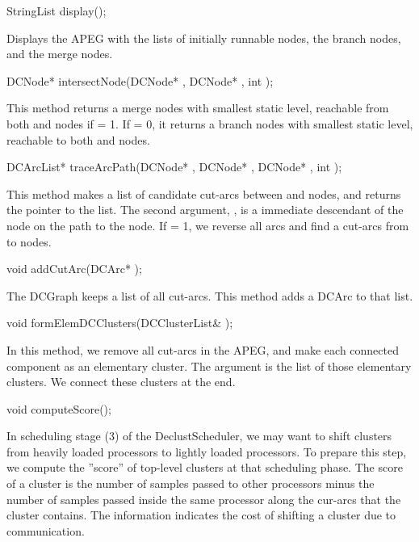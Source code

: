 \begin{example}
StringList display();
\end{example}

Displays the APEG with the lists of initially runnable nodes, the branch
nodes, and the merge nodes.

\begin{example}
DCNode* intersectNode(DCNode* , DCNode* , int );
\end{example}

This method returns a merge nodes with smallest static level, reachable from
both  and  nodes if  = 1. 
If  = 0, it returns a branch nodes with smallest static level,
reachable to both  and  nodes.

\begin{example}
DCArcList* traceArcPath(DCNode* , DCNode* , DCNode* , int );
\end{example}

This method makes a list of candidate cut-arcs between  and
 nodes, and returns the pointer to the list. 
The second argument, , is a immediate
descendant of the  node on the path to the  node.
If  = 1, we reverse all arcs and find a cut-arcs from 
 to  nodes.

\begin{example}
void addCutArc(DCArc* );
\end{example}

The DCGraph keeps a list of all cut-arcs. This method adds
a DCArc to that list.

\begin{example}
void formElemDCClusters(DCClusterList& );
\end{example}

In this method, we remove all cut-arcs in the APEG, and make each
connected component as an elementary cluster. The argument 
is the list of those elementary clusters. We connect these clusters at
the end.

\begin{example}
void computeScore();
\end{example}

In scheduling stage (3) of the DeclustScheduler, we may want to shift
clusters from heavily loaded processors to lightly loaded processors. To
prepare this step, we compute the ''score'' of top-level clusters at that
scheduling phase. The score of a cluster is the number of samples passed
to other processors minus the number of samples passed inside the same
processor along the cur-arcs that the cluster contains.
The information indicates the cost of shifting a cluster due to
communication.

